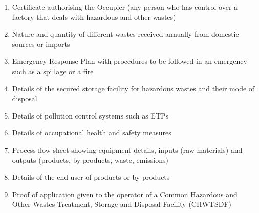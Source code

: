 \documentclass[a4paper, 12pt]{article}
\begin{document}
        \begin{enumerate}
        	\item Certificate authorising the Occupier (any person who has control over a factory that deals with hazardous and other wastes)
        	\item Nature and quantity of different wastes received annually from domestic sources or imports
        	\item Emergency Response Plan with procedures to be followed in an emergency such as a spillage or a fire
        	\item Details of the secured storage facility for hazardous wastes and their mode of disposal
        	\item Details of pollution control systems such as ETPs
        	\item Details of occupational health and safety measures
        	\item Process flow sheet showing equipment details, inputs (raw materials) and outputs (products, by-products, waste, emissions)
        	\item Details of the end user of products or by-products
        	\item Proof of application given to the operator of a Common Hazardous and Other Wastes Treatment, Storage and Disposal Facility (CHWTSDF)
        
        \end{enumerate}
        
      
         
         
\newpage       
\end{document}
